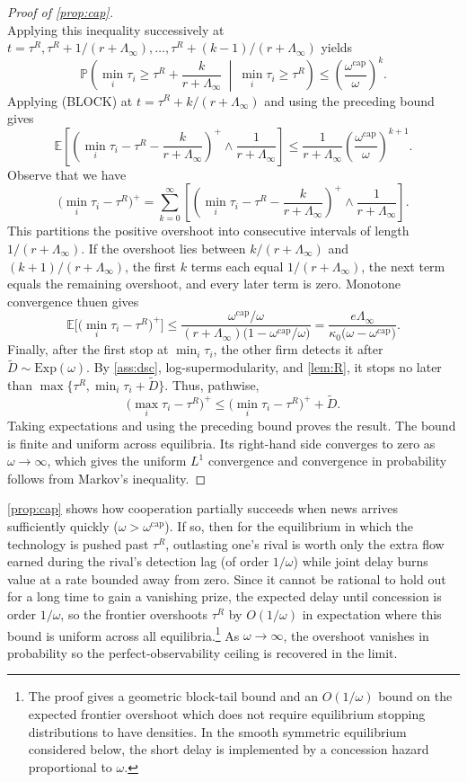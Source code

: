 \documentclass[12pt,reqno]{article}
\newcommand{\Ex}{\mathbb{E}}
\renewcommand{\Pr}{\mathbb{P}}
\theoremstyle{definition} \newtheorem{example}{Example}
\theoremstyle{definition} \newtheorem{condition}{Condition}
\theoremstyle{definition} \newtheorem{corollary}{Corollary}
\theoremstyle{definition} \newtheorem{claim}{Claim}
\theoremstyle{definition} \newtheorem{definition}{Definition}
\theoremstyle{definition} \newtheorem{conjecture}{Conjecture}
\theoremstyle{definition} \newtheorem{Lemma}{Lemma}
\theoremstyle{definition} \newtheorem{lemma}{Lemma}
\theoremstyle{plain} \newtheorem{theorem}{Theorem}
\theoremstyle{definition} \newtheorem{assumption}{Assumption}
\theoremstyle{definition} \newtheorem*{assumptionnonumber}{Assumption}
\theoremstyle{definition} \newtheorem*{theoremNoNumber}{Proposition}
\theoremstyle{definition}
\theoremstyle{definition}\newtheorem{proposition}{Proposition}
\theoremstyle{definition} \newtheorem{result}{Result}
\theoremstyle{definition} \newtheorem*{definitionNoNumber}{Definition}
\theoremstyle{definition} \newtheorem{Definition}{Definition}
\theoremstyle{definition} \newtheorem*{DefinitionNoNumber}{Definition}
\theoremstyle{definition} \newtheorem*{fact}{Fact}
\theoremstyle{definition} \newtheorem*{property}{Property}
\theoremstyle{definition} \newtheorem{remark}{Remark}
\begin{document}
\begin{proof}[Proof of \cref{prop:cap}]
\[\]
Applying this inequality successively at
$t=\tau^R,\tau^R+1/(r+\Lambda_\infty),\ldots,
\tau^R+(k-1)/(r+\Lambda_\infty)$ yields
\[
\Pr\left(
\min_i\tau_i\geq\tau^R+\frac{k}{r+\Lambda_\infty}
\ \middle|\
\min_i\tau_i\geq\tau^R
\right)
\leq
\left(\frac{\omega^{\mathrm{cap}}}{\omega}\right)^k.
\]
Applying \textup{(BLOCK)} at
$t=\tau^R+k/(r+\Lambda_\infty)$ and using the preceding bound gives
\[
\Ex\left[
\left(
\min_i\tau_i-\tau^R-\frac{k}{r+\Lambda_\infty}
\right)^+
\wedge\frac1{r+\Lambda_\infty}
\right]
\leq
\frac1{r+\Lambda_\infty}
\left(\frac{\omega^{\mathrm{cap}}}{\omega}\right)^{k+1}.
\]
Observe that we have 
\[
\big(\min_i\tau_i-\tau^R\big)^+
=
\sum_{k=0}^\infty
\left[
\left(
\min_i\tau_i-\tau^R-\frac{k}{r+\Lambda_\infty}
\right)^+
\wedge\frac1{r+\Lambda_\infty}
\right].
\]
This partitions the positive overshoot into consecutive intervals
of length $1/(r+\Lambda_\infty)$. If the overshoot lies between
$k/(r+\Lambda_\infty)$ and $(k+1)/(r+\Lambda_\infty)$, the first $k$
terms each equal $1/(r+\Lambda_\infty)$, the next term equals the remaining
overshoot, and every later term is zero.
Monotone convergence thuen gives
\[
\Ex\Big[\big(\min_i\tau_i-\tau^R\big)^+\Big]
\leq
\frac{\omega^{\mathrm{cap}}/\omega}
{(r+\Lambda_\infty)
\big(1-\omega^{\mathrm{cap}}/\omega\big)}
=
\frac{e\Lambda_\infty}
{\kappa_0\big(\omega-\omega^{\mathrm{cap}}\big)}.
\]
Finally, after the first stop at $\min_i\tau_i$, the other firm detects it
after $\widetilde D\sim\mathrm{Exp}(\omega)$. By \cref{ass:dsc},
log-supermodularity, and \cref{lem:R}, it stops no later than
$\max\{\tau^R,\min_i\tau_i+\widetilde D\}$. Thus, pathwise,
\[
\big(\max_i\tau_i-\tau^R\big)^+
\leq
\big(\min_i\tau_i-\tau^R\big)^+
+\widetilde D.
\]
Taking expectations and using the preceding bound proves the result. The bound
is finite and uniform across equilibria. Its right-hand side converges to zero
as $\omega\to\infty$, which gives the uniform $L^1$ convergence and convergence in
probability follows from Markov's inequality.
\end{proof}



\cref{prop:cap} shows how cooperation partially succeeds when news arrives sufficiently quickly ($\omega > \omega^{\mathrm{cap}}$). If so, then for the equilibrium in which the technology is pushed past $\tau^R$,  outlasting one's rival is worth only the extra flow earned during the rival's detection lag (of order $1/\omega$) while joint delay burns value at a rate bounded away from zero. Since it cannot be rational to hold out for a long time to gain a vanishing prize, the expected delay until concession is  order $1/\omega$, so the frontier overshoots $\tau^R$ by $O(1/\omega)$ in expectation where this bound is uniform across all equilibria.\footnote{The proof gives a geometric block-tail bound and an $O(1/\omega)$ bound on the expected frontier overshoot which does not require equilibrium stopping distributions to have densities. In the smooth symmetric equilibrium considered below, the short delay is implemented by a concession hazard proportional to $\omega$.} As $\omega\to\infty$, the overshoot vanishes in probability so the perfect-observability ceiling is recovered in the limit.  
\end{document}
